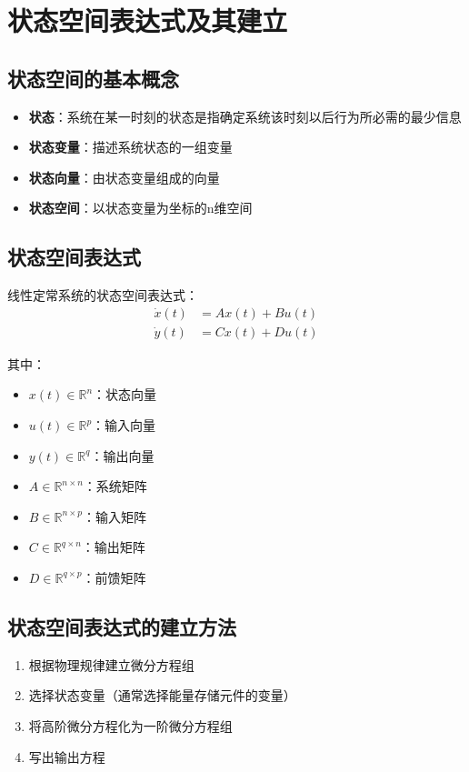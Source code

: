 \section{状态空间表达式及其建立}

\subsection{状态空间的基本概念}
\begin{itemize}
    \item \textbf{状态}：系统在某一时刻的状态是指确定系统该时刻以后行为所必需的最少信息
    \item \textbf{状态变量}：描述系统状态的一组变量
    \item \textbf{状态向量}：由状态变量组成的向量
    \item \textbf{状态空间}：以状态变量为坐标的n维空间
\end{itemize}

\subsection{状态空间表达式}
线性定常系统的状态空间表达式：
\begin{align}
\dot{x}(t) &= Ax(t) + Bu(t) \\
\dot{y}(t) &= Cx(t) + Du(t)
\end{align}

其中：
\begin{itemize}
    \item $x(t) \in \mathbb{R}^n$：状态向量
    \item $u(t) \in \mathbb{R}^p$：输入向量
    \item $y(t) \in \mathbb{R}^q$：输出向量
    \item $A \in \mathbb{R}^{n \times n}$：系统矩阵
    \item $B \in \mathbb{R}^{n \times p}$：输入矩阵
    \item $C \in \mathbb{R}^{q \times n}$：输出矩阵
    \item $D \in \mathbb{R}^{q \times p}$：前馈矩阵
\end{itemize}

\subsection{状态空间表达式的建立方法}
\begin{enumerate}
    \item 根据物理规律建立微分方程组
    \item 选择状态变量（通常选择能量存储元件的变量）
    \item 将高阶微分方程化为一阶微分方程组
    \item 写出输出方程
\end{enumerate}
